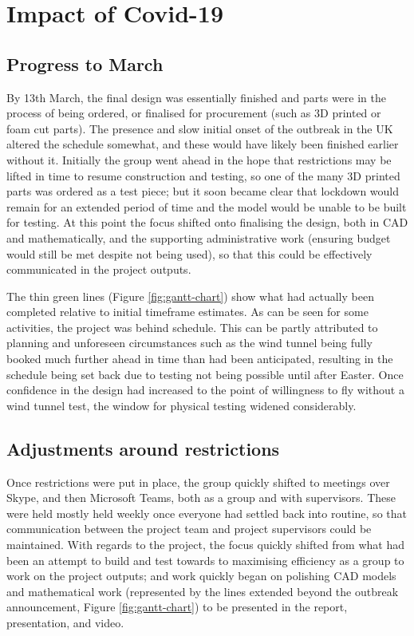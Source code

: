 \documentclass[../../main.tex]{subfiles}
\begin{document}
\section{Impact of Covid-19} \label{sec:project-review:impact-of-covid-19}

\subsection{Progress to March} \label{sec:project-review:impact-of-covid-19:progress-to-march}

By 13th March, the final design was essentially finished and parts were in the process of being ordered, or finalised for procurement (such as 3D printed or foam cut parts).
The presence and slow initial onset of the outbreak in the UK altered the schedule somewhat, and these would have likely been finished earlier without it.
Initially the group went ahead in the hope that restrictions may be lifted in time to resume construction and testing, so one of the many 3D printed parts was ordered as a test piece; but it soon became clear that lockdown would remain for an extended period of time and the model would be unable to be built for testing.
At this point the focus shifted onto finalising the design, both in CAD and mathematically, and the supporting administrative work (ensuring budget would still be met despite not being used), so that this could be effectively communicated in the project outputs. 

The thin green lines (Figure \ref{fig:gantt-chart}) show what had actually been completed relative to initial timeframe estimates.
As can be seen for some activities, the project was behind schedule.
This can be partly attributed to planning and unforeseen circumstances such as the wind tunnel being fully booked much further ahead in time than had been anticipated, resulting in the schedule being set back due to testing not being possible until after Easter.
Once confidence in the design had increased to the point of willingness to fly without a wind tunnel test, the window for physical testing widened considerably. 

\subsection{Adjustments around restrictions} \label{sec:project-review:impact-of-covid-19:adjustments-around-restrictions}

Once restrictions were put in place, the group quickly shifted to meetings over Skype, and then Microsoft Teams, both as a group and with supervisors.
These were held mostly held weekly once everyone had settled back into routine, so that communication between the project team and project supervisors could be maintained.
With regards to the project, the focus quickly shifted from what had been an attempt to build and test towards to maximising efficiency as a group to work on the project outputs; and work quickly began on polishing CAD models and mathematical work (represented by the lines extended beyond the outbreak announcement, Figure \ref{fig:gantt-chart}) to be presented in the report, presentation, and video.
\end{document}
